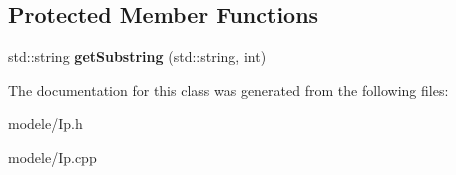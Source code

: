 \subsection*{Protected Member Functions}
\begin{DoxyCompactItemize}
\item 
\hypertarget{class_ip_abbaa9dcb71a94ec23afa6c18b7c48c39}{std\-::string {\bfseries get\-Substring} (std\-::string, int)}\label{class_ip_abbaa9dcb71a94ec23afa6c18b7c48c39}

\end{DoxyCompactItemize}


The documentation for this class was generated from the following files\-:\begin{DoxyCompactItemize}
\item 
modele/Ip.\-h\item 
modele/Ip.\-cpp\end{DoxyCompactItemize}

